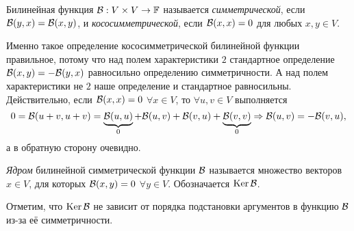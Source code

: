 \begin{definition}
    Билинейная функция $\mathcal{B}: V \times V \to \mathbb{F}$ называется \textit{симметрической}, если $\mathcal{B}(y, x) = \mathcal{B}(x, y)$, и \textit{кососимметрической}, если $\mathcal{B}(x, x) = 0$ для любых $x, y \in V$.
\end{definition}

\begin{remark}
    Именно такое определение кососимметрической билинейной функции правильное, потому что над полем характеристики $2$ стандартное определение $\mathcal{B}(x, y) = -\mathcal{B}(y, x)$ равносильно определению симметричности. А над полем характеристики не $2$ наше определение и стандартное равносильны. Действительно, если $\mathcal{B}(x, x) = 0$ $\forall x \in V$, то $\forall u, v \in V$ выполняется
    \[
        0 = \mathcal{B}(u + v, u + v) = \underbrace{\mathcal{B}(u, u)}_{0} + \mathcal{B}(u, v) + \mathcal{B}(v, u) + \underbrace{\mathcal{B}(v, v)}_{0} \Rightarrow \mathcal{B}(u, v) = -\mathcal{B}(v, u),
    \]
    а в обратную сторону очевидно.
\end{remark}

\begin{definition}
    \textit{Ядром} билинейной симметрической функции $\mathcal{B}$ называется множество векторов $x \in V$, для которых $\mathcal{B}(x, y) = 0$ $\forall y \in V$. Обозначается $\operatorname{Ker}\mathcal{B}$.
\end{definition}

Отметим, что $\operatorname{Ker}\mathcal{B}$ не зависит от порядка подстановки аргументов в функцию $\mathcal{B}$ из-за её симметричности.

